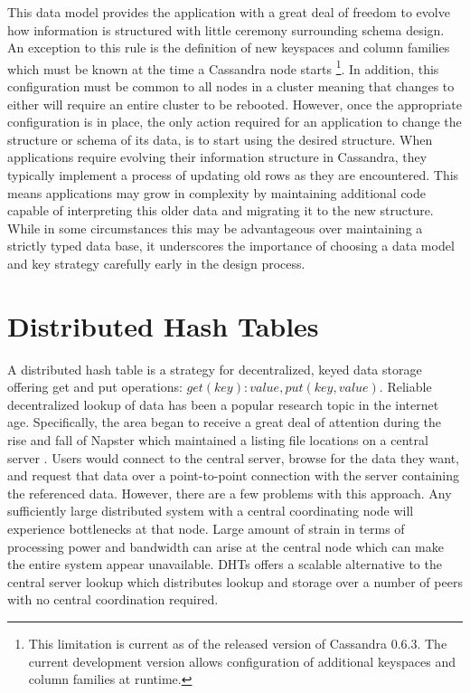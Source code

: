 \documentclass[twocolumn]{article}
\begin{document}
This data model provides the application with a great deal of freedom to evolve how information is structured with little ceremony surrounding schema design.  An exception to this rule is the definition of new keyspaces and column families which must be known at the time a Cassandra node starts \footnote[1]{This limitation is current as of the released version of Cassandra 0.6.3.  The current development version allows configuration of additional keyspaces and column families at runtime.}.  In addition, this configuration must be common to all nodes in a cluster meaning that changes to either will require an entire cluster to be rebooted.  However, once the appropriate configuration is in place, the only action required for an application to change the structure or schema of its data, is to start using the desired structure.  When applications require evolving their information structure in Cassandra, they typically implement a process of updating old rows as they are encountered.  This means applications may grow in complexity by maintaining additional code capable of interpreting this older data and migrating it to the new structure.  While in some circumstances this may be advantageous over maintaining a strictly typed data base, it underscores the importance of choosing a data model and key strategy carefully early in the design process.

\section{Distributed Hash Tables}\label{s:dht}


A distributed hash table is a strategy for decentralized, keyed data storage offering get and put operations: $get(key):value, put(key,value)$. Reliable decentralized lookup of data has been a popular research topic in the internet age.  Specifically, the area began to receive a great deal of attention during the rise and fall of Napster which maintained a listing file locations on a central server \cite{ref:beyondnap,ref:dht}.  Users would connect to the central server, browse for the data they want, and request that data over a point-to-point connection with the server containing the referenced data. However, there are a few problems with this approach. Any sufficiently large distributed system with a central coordinating node will experience bottlenecks at that node.  Large amount of strain in terms of processing power and bandwidth can arise at the central node which can make the entire system appear unavailable. DHTs offers a scalable alternative to the central server lookup which distributes lookup and storage over a number of peers with no central coordination required.
\end{document}
